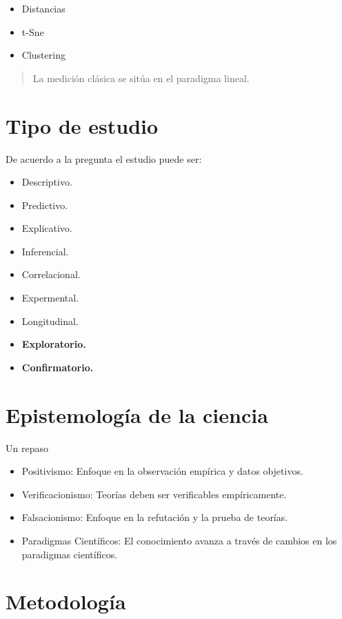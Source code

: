 \documentclass[
  letterpaper,
  DIV=11,
  numbers=noendperiod]{scrreprt}
\providecommand{\tightlist}{%
  \setlength{\itemsep}{0pt}\setlength{\parskip}{0pt}}\usepackage{longtable,booktabs,array}
\begin{document}
\begin{itemize}
\item
  Distancias
\item
  t-Sne
\item
  Clustering
\end{itemize}

\begin{quote}
La medición clásica se sitúa en el paradigma lineal.
\end{quote}

\section{Tipo de estudio}\label{tipo-de-estudio}

De acuerdo a la pregunta el estudio puede ser:

\begin{itemize}
\tightlist
\item
  Descriptivo.
\item
  Predictivo.
\item
  Explicativo.
\item
  Inferencial.
\item
  Correlacional.
\item
  Expermental.
\item
  Longitudinal.
\item
  \textbf{Exploratorio.}
\item
  \textbf{Confirmatorio.}
\end{itemize}

\section{Epistemología de la
ciencia}\label{epistemologuxeda-de-la-ciencia}

Un repaso

\begin{itemize}
\item
  Positivismo: Enfoque en la observación empírica y datos objetivos.
\item
  Verificacionismo: Teorías deben ser verificables empíricamente.
\item
  Falsacionismo: Enfoque en la refutación y la prueba de teorías.
\item
  Paradigmas Científicos: El conocimiento avanza a través de cambios en
  los paradigmas científicos.
\end{itemize}

\section{Metodología}\label{metodologuxeda-2}
\end{document}
